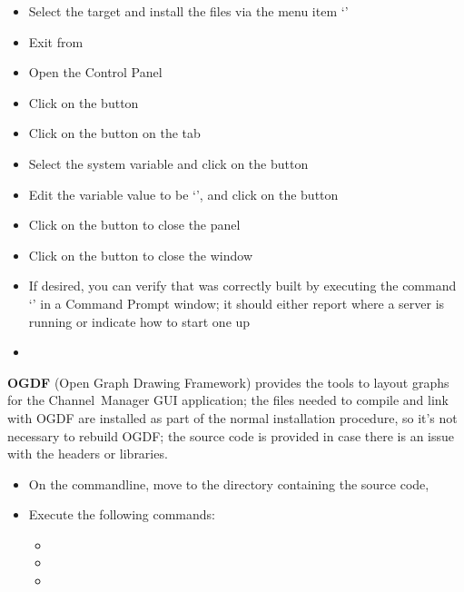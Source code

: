 \begin{itemize}
`'
\item\exSp{} Select the  target and install the  files via
the menu item `'
\item\exSp{} Exit from 
\item\exSp{} Open the  Control Panel
\item\exSp{} Click on the  button
\item\exSp{} Click on the  button on the 
tab
\item\exSp{} Select the  system variable and click on the
 button 
\item\exSp{} Edit the variable value to be
`', and click on the 
button
\item\exSp{} Click on the  button to close the 
panel
\item\exSp{} Click on the  button to close the 
window
\item\exSp{} If desired, you can verify that \yarp{} was correctly built by executing the
command `' in a Command Prompt window; it should either report where a
\yarp{} server is running or indicate how to start one up
\end{itemize}
\tertiaryEnd
{}
\begin{itemize}
\item\TBD
\end{itemize}
\tertiaryEnd
\secondaryEnd
{}
\textbf{OGDF} (Open Graph Drawing Framework) provides the tools to layout graphs for the
Channel~Manager GUI application; the files needed to compile and link with OGDF are
installed as part of the normal \mplusm{} installation procedure, so it's not necessary to
rebuild OGDF; the source code is provided in case there is an issue with the headers or
libraries.
\begin{itemize}
\item On the command\longDash{}line, move to the directory containing the \mplusm{} source
code, 
\item\exSp{} Execute the following commands:
\begin{itemize}
\item{}
\item\exSp{}
\item\exSp{}
\end{itemize}
\end{itemize}
